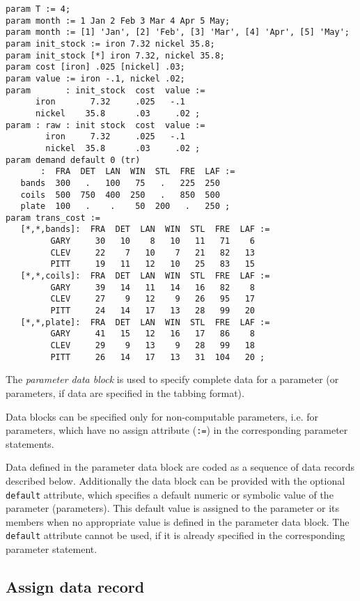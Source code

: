 \documentclass[11pt]{report}
\begin{document}
\begin{verbatim}
param T := 4;
param month := 1 Jan 2 Feb 3 Mar 4 Apr 5 May;
param month := [1] 'Jan', [2] 'Feb', [3] 'Mar', [4] 'Apr', [5] 'May';
param init_stock := iron 7.32 nickel 35.8;
param init_stock [*] iron 7.32, nickel 35.8;
param cost [iron] .025 [nickel] .03;
param value := iron -.1, nickel .02;
param       : init_stock  cost  value :=
      iron       7.32     .025   -.1
      nickel    35.8      .03     .02 ;
param : raw : init stock  cost  value :=
        iron     7.32     .025   -.1
        nickel  35.8      .03     .02 ;
param demand default 0 (tr)
       :  FRA  DET  LAN  WIN  STL  FRE  LAF :=
   bands  300   .   100   75   .   225  250
   coils  500  750  400  250   .   850  500
   plate  100   .    .    50  200   .   250 ;
param trans_cost :=
   [*,*,bands]:  FRA  DET  LAN  WIN  STL  FRE  LAF :=
         GARY     30   10    8   10   11   71    6
         CLEV     22    7   10    7   21   82   13
         PITT     19   11   12   10   25   83   15
   [*,*,coils]:  FRA  DET  LAN  WIN  STL  FRE  LAF :=
         GARY     39   14   11   14   16   82    8
         CLEV     27    9   12    9   26   95   17
         PITT     24   14   17   13   28   99   20
   [*,*,plate]:  FRA  DET  LAN  WIN  STL  FRE  LAF :=
         GARY     41   15   12   16   17   86    8
         CLEV     29    9   13    9   28   99   18
         PITT     26   14   17   13   31  104   20 ;
\end{verbatim}

The {\it parameter data block} is used to specify complete data for a
parameter (or parameters, if data are specified in the tabbing format).

Data blocks can be specified only for non-computable parameters, i.e.
for parameters, which have no assign attribute ({\tt:=}) in the
corresponding parameter statements.

Data defined in the parameter data block are coded as a sequence of
data records described below. Additionally the data block can be
provided with the optional {\tt default} attribute, which specifies a
default numeric or symbolic value of the parameter (parameters). This
default value is assigned to the parameter or its members when
no appropriate value is defined in the parameter data block. The
{\tt default} attribute cannot be used, if it is already specified in
the corresponding parameter statement.

\subsection{Assign data record}
\end{document}
